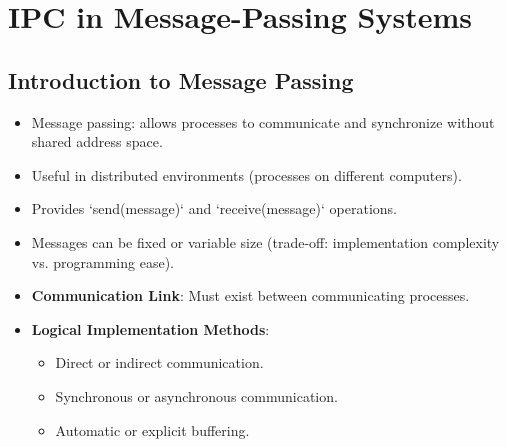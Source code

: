 \section{IPC in Message-Passing Systems}\label{sec:3.6}

\subsection{Introduction to Message Passing}
\begin{itemize}
    \item Message passing: allows processes to communicate and synchronize without shared address space.
    \item Useful in distributed environments (processes on different computers).
    \item Provides `send(message)` and `receive(message)` operations.
    \item Messages can be fixed or variable size (trade-off: implementation complexity vs. programming ease).
    \item \textbf{Communication Link}: Must exist between communicating processes.
    \item \textbf{Logical Implementation Methods}:
        \begin{itemize}
            \item Direct or indirect communication.
            \item Synchronous or asynchronous communication.
            \item Automatic or explicit buffering.
        \end{itemize}
\end{itemize}


